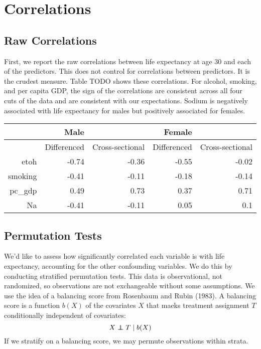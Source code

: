 \documentclass[11pt]{article}\usepackage[]{graphicx}\usepackage[]{color}
\newcommand\independent{\protect\mathpalette{\protect\independenT}{\perp}}
\def\independenT#1#2{\mathrel{\rlap{$#1#2$}\mkern2mu{#1#2}}}
\begin{document}
\section{Correlations}
\subsection{Raw Correlations}
First, we report the raw correlations between life expectancy at age 30 and each of the predictors.
This does not control for correlations between predictors.
It is the crudest measure.
Table TODO shows these correlations.
For alcohol, smoking, and per capita GDP, the sign of the correlations are consistent across all four cuts of the data and are consistent with our expectations.
Sodium is negatively associated with life expectancy for males but positively associated for females.

\begin{table}[ht]
\centering
\begin{tabular}{r|rr|rr}
   \hline
 & Male &  & Female &  \\ 
   \hline
   & Differenced & Cross-sectional & Differenced & Cross-sectional \\ 
   \hline
etoh & -0.74 & -0.36 & -0.55 & -0.02 \\ 
  smoking & -0.41 & -0.11 & -0.18 & -0.14 \\ 
  pc\_gdp & 0.49 & 0.73 & 0.37 & 0.71 \\ 
  Na & -0.41 & -0.11 & 0.05 & 0.1 \\ 
   \hline
\end{tabular}
\end{table}


\subsection{Permutation Tests}
We'd like to assess how significantly correlated each variable is with life expectancy, accounting for the other confounding variables.
We do this by conducting stratified permutation tests.
This data is observational, not randomized, so observations are not exchangeable without some assumptions.
We use the idea of a balancing score from Rosenbaum and Rubin (1983).
A balancing score is a function $b(X)$ of the covariates $X$ that maeks treatment assignment $T$ conditionally independent of covariates:
$$X \independent T \mid b(X)$$
If we stratify on a balancing score, we may permute observations within strata.
\end{document}
